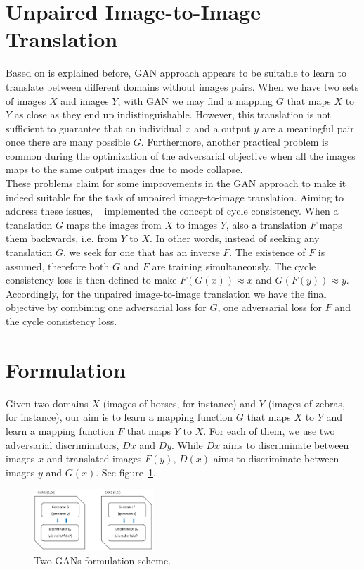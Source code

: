 \documentclass[]{IEEEtran}
\begin{document}
\section{Unpaired Image-to-Image Translation}
Based on is explained before, GAN approach appears to be suitable to learn to translate between different domains without images pairs. When we have two sets of images $X$ and images $Y$, with GAN we may find a mapping $G$ that maps $X$ to $Y$ as close as they end up indistinguishable. However, this translation is not sufficient to guarantee that an individual $x$ and a output $y$ are a meaningful pair once there are many possible $G$. Furthermore, another practical problem is common during the optimization of the adversarial objective when all the images maps to the same output images due to mode collapse.\\
These problems claim for some improvements in the GAN approach to make it indeed suitable for the task of unpaired image-to-image translation. Aiming to address these issues, ~\cite{CycleGAN} implemented the concept of cycle consistency. When a translation $G$ maps the images from $X$ to images $Y$, also a translation $F$ maps them backwards, i.e. from $Y$ to $X$. In other words, instead of seeking any translation $G$, we seek for one that has an inverse $F$. The existence of $F$ is assumed, therefore both $G$ and $F$ are training simultaneously. The cycle consistency loss is then defined to make $F(G(x)) \approx x$  and $G(F(y)) \approx y$. Accordingly, for the unpaired image-to-image translation we have the final objective by combining one adversarial loss for $G$, one adversarial loss for $F$ and the cycle consistency loss. \\


\section{Formulation}
Given two domains $X$ (images of horses, for instance) and $Y$ (images of zebras, for instance), our aim is to learn a mapping function $G$ that maps $X$ to $Y$ and learn a mapping function $F$ that maps $Y$ to $X$. For each of them, we use two adversarial discriminators, $Dx$ and $Dy$. While $Dx$ aims to discriminate between images $x$ and translated images $F(y)$, $D(x)$ aims to discriminate between images $y$ and $G(x)$. See figure~\ref{2GANs}. 

\begin{figure}[ht]
  \centering
  \includegraphics[width=0.4\textwidth]{./images/2GANs.png}
  \hspace{1mm}
   \caption{Two GANs formulation scheme.}
\label{2GANs}
\end{figure}\par
\end{document}
